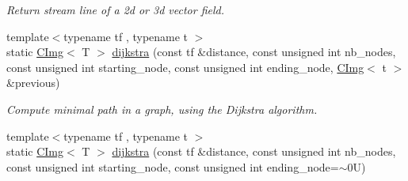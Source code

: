 \begin{DoxyCompactItemize}
\begin{DoxyCompactList}\small\item\em Return stream line of a 2d or 3d vector field. \item\end{DoxyCompactList}\item 
{\footnotesize template$<$typename tf , typename t $>$ }\\static \hyperlink{structcimg__library_1_1CImg}{CImg}$<$ T $>$ \hyperlink{structcimg__library_1_1CImg_af2b4fdd725a79235943e5cc5704a32d5}{dijkstra} (const tf \&distance, const unsigned int nb\_\-nodes, const unsigned int starting\_\-node, const unsigned int ending\_\-node, \hyperlink{structcimg__library_1_1CImg}{CImg}$<$ t $>$ \&previous)
\begin{DoxyCompactList}\small\item\em Compute minimal path in a graph, using the Dijkstra algorithm. \item\end{DoxyCompactList}\item 
\hypertarget{structcimg__library_1_1CImg_adad65a3bfabe64171d5fd68dc2c7f16e}{
{\footnotesize template$<$typename tf , typename t $>$ }\\static \hyperlink{structcimg__library_1_1CImg}{CImg}$<$ T $>$ \hyperlink{structcimg__library_1_1CImg_adad65a3bfabe64171d5fd68dc2c7f16e}{dijkstra} (const tf \&distance, const unsigned int nb\_\-nodes, const unsigned int starting\_\-node, const unsigned int ending\_\-node=$\sim$0U)}
\label{structcimg__library_1_1CImg_adad65a3bfabe64171d5fd68dc2c7f16e}


\end{DoxyCompactItemize}
